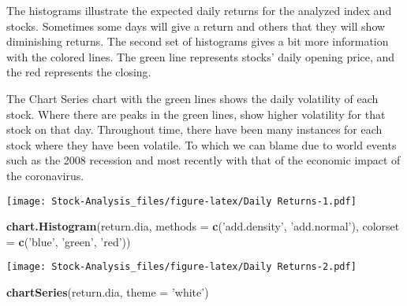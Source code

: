 \documentclass[
]{article}
\newenvironment{Shaded}{\begin{snugshade}}{\end{snugshade}}
\newcommand{\CommentTok}[1]{\textcolor[rgb]{0.56,0.35,0.01}{\textit{#1}}}
\newcommand{\DataTypeTok}[1]{\textcolor[rgb]{0.13,0.29,0.53}{#1}}
\newcommand{\DecValTok}[1]{\textcolor[rgb]{0.00,0.00,0.81}{#1}}
\newcommand{\KeywordTok}[1]{\textcolor[rgb]{0.13,0.29,0.53}{\textbf{#1}}}
\newcommand{\NormalTok}[1]{#1}
\newcommand{\OperatorTok}[1]{\textcolor[rgb]{0.81,0.36,0.00}{\textbf{#1}}}
\newcommand{\StringTok}[1]{\textcolor[rgb]{0.31,0.60,0.02}{#1}}
\begin{document}
The histograms illustrate the expected daily returns for the analyzed
index and stocks. Sometimes some days will give a return and others that
they will show diminishing returns. The second set of histograms gives a
bit more information with the colored lines. The green line represents
stocks' daily opening price, and the red represents the closing.

The Chart Series chart with the green lines shows the daily volatility
of each stock. Where there are peaks in the green lines, show higher
volatility for that stock on that day. Throughout time, there have been
many instances for each stock where they have been volatile. To which we
can blame due to world events such as the 2008 recession and most
recently with that of the economic impact of the coronavirus.

\begin{Shaded}
\end{Shaded}

\texttt{[image: Stock-Analysis\_files/figure-latex/Daily Returns-1.pdf]}

\begin{Shaded}
\begin{Highlighting}[]
\KeywordTok{chart.Histogram}\NormalTok{(return.dia,}
                \DataTypeTok{methods =} \KeywordTok{c}\NormalTok{(}\StringTok{'add.density'}\NormalTok{, }\StringTok{'add.normal'}\NormalTok{),}
                \DataTypeTok{colorset =} \KeywordTok{c}\NormalTok{(}\StringTok{'blue'}\NormalTok{, }\StringTok{'green'}\NormalTok{, }\StringTok{'red'}\NormalTok{))}
\end{Highlighting}
\end{Shaded}

\texttt{[image: Stock-Analysis\_files/figure-latex/Daily Returns-2.pdf]}

\begin{Shaded}
\begin{Highlighting}[]
\KeywordTok{chartSeries}\NormalTok{(return.dia, }\DataTypeTok{theme =} \StringTok{'white'}\NormalTok{)}
\end{Highlighting}
\end{Shaded}
\end{document}
